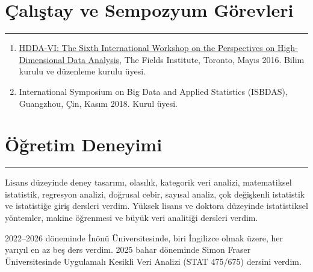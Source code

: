 \documentclass[10pt,a4paper]{article}
\newcommand{\NewPart}[2]{%
	\Needspace{7\baselineskip}%
	\vspace{0.45em}%
	\section*{\sffamily\large\bfseries\color{MidnightBlue}#1 #2}%
	\vspace{-0.7em}\noindent\color{MidnightBlue}\rule{\textwidth}{0.55pt}\color{Black}\vspace{0.25em}}
\newcommand{\ThesisEntry}[5]{
		\noindent #1 -- #2 #3 ``#4'' \textit{#5}}
\begin{document}








\NewPart{Çalıştay ve Sempozyum Görevleri}{}

\begin{enumerate}

\item \href{http://www.fields.utoronto.ca/activities/15-16/HDDA}{HDDA-VI: The Sixth International Workshop on the Perspectives on High-Dimensional Data Analysis}, The Fields Institute, Toronto, Mayıs 2016. Bilim kurulu ve düzenleme kurulu üyesi.

\item International Symposium on Big Data and Applied Statistics (ISBDAS), Guangzhou, Çin, Kasım 2018. Kurul üyesi.

\end{enumerate}



\NewPart{Öğretim Deneyimi}{}

Lisans düzeyinde deney tasarımı, olasılık, kategorik veri analizi, matematiksel istatistik, regresyon analizi, doğrusal cebir, sayısal analiz, çok değişkenli istatistik ve istatistiğe giriş dersleri verdim. Yüksek lisans ve doktora düzeyinde istatistiksel yöntemler, makine öğrenmesi ve büyük veri analitiği dersleri verdim.

2022--2026 döneminde İnönü Üniversitesinde, biri İngilizce olmak üzere, her yarıyıl en az beş ders verdim. 2025 bahar döneminde Simon Fraser Üniversitesinde Uygulamalı Kesikli Veri Analizi (STAT 475/675) dersini verdim.
\end{document}
